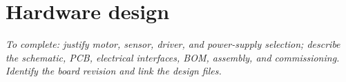 \section{Hardware design}
\textit{To complete: justify motor, sensor, driver, and power-supply selection; describe the schematic, PCB, electrical interfaces, BOM, assembly, and commissioning. Identify the board revision and link the design files.}
